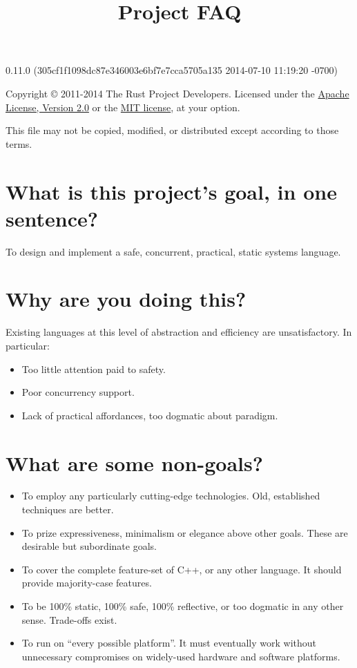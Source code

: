 \documentclass[]{article}
\title{Project FAQ}
\begin{document}
\maketitle

0.11.0 (305cf1f1098dc87e346003e6bf7e7cca5705a135 2014-07-10 11:19:20 -0700)

Copyright © 2011-2014 The Rust Project Developers. Licensed under the
\href{http://www.apache.org/licenses/LICENSE-2.0}{Apache License,
Version 2.0} or the \href{http://opensource.org/licenses/MIT}{MIT
license}, at your option.

This file may not be copied, modified, or distributed except according
to those terms.

{
\hypersetup{linkcolor=black}
\setcounter{tocdepth}{3}
\tableofcontents
}
\section{What is this project's goal, in one
sentence?}\label{what-is-this-projects-goal-in-one-sentence}

To design and implement a safe, concurrent, practical, static systems
language.

\section{Why are you doing this?}\label{why-are-you-doing-this}

Existing languages at this level of abstraction and efficiency are
unsatisfactory. In particular:

\begin{itemize}
\itemsep1pt\parskip0pt
\item
  Too little attention paid to safety.
\item
  Poor concurrency support.
\item
  Lack of practical affordances, too dogmatic about paradigm.
\end{itemize}

\section{What are some non-goals?}\label{what-are-some-non-goals}

\begin{itemize}
\itemsep1pt\parskip0pt
\item
  To employ any particularly cutting-edge technologies. Old, established
  techniques are better.
\item
  To prize expressiveness, minimalism or elegance above other goals.
  These are desirable but subordinate goals.
\item
  To cover the complete feature-set of C++, or any other language. It
  should provide majority-case features.
\item
  To be 100\% static, 100\% safe, 100\% reflective, or too dogmatic in
  any other sense. Trade-offs exist.
\item
  To run on ``every possible platform''. It must eventually work without
  unnecessary compromises on widely-used hardware and software
  platforms.
\end{itemize}
\end{document}

